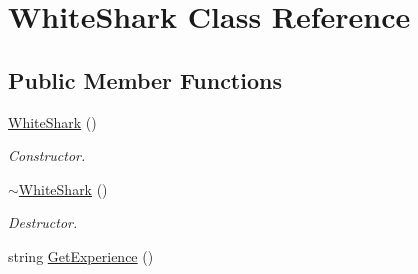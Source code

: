 \hypertarget{class_white_shark}{}\section{White\+Shark Class Reference}
\label{class_white_shark}
\subsection*{Public Member Functions}
\begin{DoxyCompactItemize}
\item 
\hyperlink{class_white_shark_abd3e920a0808c805c07350003157057c}{White\+Shark} ()\hypertarget{class_white_shark_abd3e920a0808c805c07350003157057c}{}\label{class_white_shark_abd3e920a0808c805c07350003157057c}

\begin{DoxyCompactList}\small\item\em Constructor. \end{DoxyCompactList}\item 
\hyperlink{class_white_shark_a2439ac23fc52f5352ce4779ad5b843a1}{$\sim$\+White\+Shark} ()\hypertarget{class_white_shark_a2439ac23fc52f5352ce4779ad5b843a1}{}\label{class_white_shark_a2439ac23fc52f5352ce4779ad5b843a1}

\begin{DoxyCompactList}\small\item\em Destructor. \end{DoxyCompactList}\item 
string \hyperlink{class_white_shark_a5be2a218eca6557a62217552e38f14c3}{Get\+Experience} ()\hypertarget{class_white_shark_a5be2a218eca6557a62217552e38f14c3}{}\label{class_white_shark_a5be2a218eca6557a62217552e38f14c3}


\end{DoxyCompactItemize}

